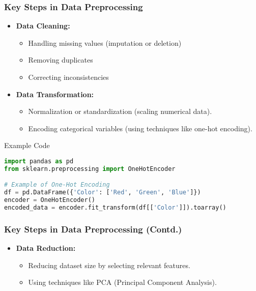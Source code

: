 \documentclass[aspectratio=169]{beamer}
\begin{document}
\begin{frame}[fragile]
    \frametitle{Key Steps in Data Preprocessing}
    \begin{itemize}
        \item \textbf{Data Cleaning:}
        \begin{itemize}
            \item Handling missing values (imputation or deletion)
            \item Removing duplicates
            \item Correcting inconsistencies
        \end{itemize}
        
        \item \textbf{Data Transformation:}
        \begin{itemize}
            \item Normalization or standardization (scaling numerical data).
            \item Encoding categorical variables (using techniques like one-hot encoding).
        \end{itemize}
    \end{itemize}
    \begin{block}{Example Code}
        \begin{lstlisting}[language=Python]
import pandas as pd
from sklearn.preprocessing import OneHotEncoder

# Example of One-Hot Encoding
df = pd.DataFrame({'Color': ['Red', 'Green', 'Blue']})
encoder = OneHotEncoder()
encoded_data = encoder.fit_transform(df[['Color']]).toarray()
        \end{lstlisting}
    \end{block}
\end{frame}

\begin{frame}[fragile]
    \frametitle{Key Steps in Data Preprocessing (Contd.)}
    \begin{itemize}
        \item \textbf{Data Reduction:}
        \begin{itemize}
            \item Reducing dataset size by selecting relevant features.
            \item Using techniques like PCA (Principal Component Analysis).
        \end{itemize}
    \end{itemize}
\end{frame}
\end{document}
